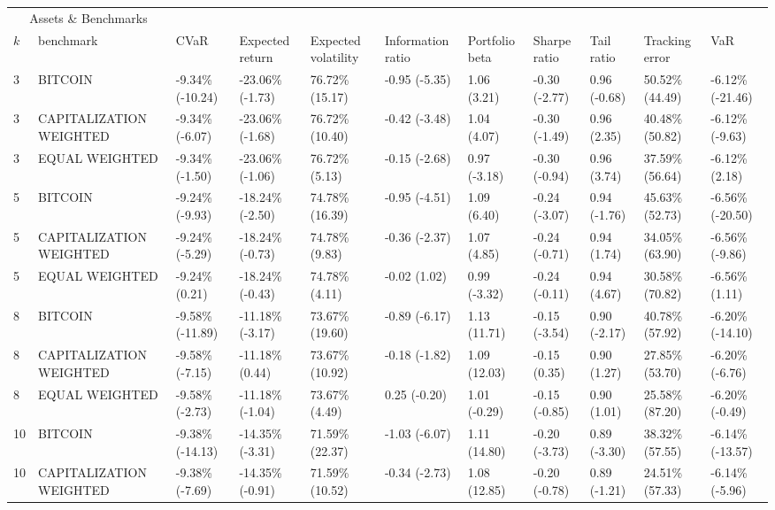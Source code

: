 \documentclass{article}
\begin{document}
\begin{landscape}
\begin{table}[H]
  \centering
  \begin{tabular}{p{0.4cm}|p{3cm}|p{1.65cm}|p{1.65cm}|p{1.65cm}|p{1.65cm}|p{1.65cm}|p{1.65cm}|p{1.65cm}|p{1.65cm}|p{1.65cm}}%
    \toprule
    \multicolumn{2}{c}{Assets \& Benchmarks}                   \\
    \cmidrule(r){1-2}
    $k$ & benchmark & CVaR & Expected return & Expected volatility&Information ratio&Portfolio beta&Sharpe ratio&Tail ratio&Tracking error&VaR\\
    \midrule 
3&BITCOIN&-9.34\% (-10.24)&-23.06\% (-1.73)&76.72\% (15.17)&-0.95 (-5.35)&1.06 (3.21)&-0.30 (-2.77)&0.96 (-0.68)&50.52\% (44.49)&-6.12\% (-21.46)
\\ 
3&CAPITALIZATION WEIGHTED&-9.34\% (-6.07)&-23.06\% (-1.68)&76.72\% (10.40)&-0.42 (-3.48)&1.04 (4.07)&-0.30 (-1.49)&0.96 (2.35)&40.48\% (50.82)&-6.12\% (-9.63)
\\ 
3&EQUAL WEIGHTED&-9.34\% (-1.50)&-23.06\% (-1.06)&76.72\% (5.13)&-0.15 (-2.68)&0.97 (-3.18)&-0.30 (-0.94)&0.96 (3.74)&37.59\% (56.64)&-6.12\% (2.18)
\\ 
5&BITCOIN&-9.24\% (-9.93)&-18.24\% (-2.50)&74.78\% (16.39)&-0.95 (-4.51)&1.09 (6.40)&-0.24 (-3.07)&0.94 (-1.76)&45.63\% (52.73)&-6.56\% (-20.50)
\\ 
5&CAPITALIZATION WEIGHTED&-9.24\% (-5.29)&-18.24\% (-0.73)&74.78\% (9.83)&-0.36 (-2.37)&1.07 (4.85)&-0.24 (-0.71)&0.94 (1.74)&34.05\% (63.90)&-6.56\% (-9.86)
\\ 
5&EQUAL WEIGHTED&-9.24\% (0.21)&-18.24\% (-0.43)&74.78\% (4.11)&-0.02 (1.02)&0.99 (-3.32)&-0.24 (-0.11)&0.94 (4.67)&30.58\% (70.82)&-6.56\% (1.11)
\\ 
8&BITCOIN&-9.58\% (-11.89)&-11.18\% (-3.17)&73.67\% (19.60)&-0.89 (-6.17)&1.13 (11.71)&-0.15 (-3.54)&0.90 (-2.17)&40.78\% (57.92)&-6.20\% (-14.10)
\\ 
8&CAPITALIZATION WEIGHTED&-9.58\% (-7.15)&-11.18\% (0.44)&73.67\% (10.92)&-0.18 (-1.82)&1.09 (12.03)&-0.15 (0.35)&0.90 (1.27)&27.85\% (53.70)&-6.20\% (-6.76)
\\ 
8&EQUAL WEIGHTED&-9.58\% (-2.73)&-11.18\% (-1.04)&73.67\% (4.49)&0.25 (-0.20)&1.01 (-0.29)&-0.15 (-0.85)&0.90 (1.01)&25.58\% (87.20)&-6.20\% (-0.49)
\\ 
10&BITCOIN&-9.38\% (-14.13)&-14.35\% (-3.31)&71.59\% (22.37)&-1.03 (-6.07)&1.11 (14.80)&-0.20 (-3.73)&0.89 (-3.30)&38.32\% (57.55)&-6.14\% (-13.57)
\\ 
10&CAPITALIZATION WEIGHTED&-9.38\% (-7.69)&-14.35\% (-0.91)&71.59\% (10.52)&-0.34 (-2.73)&1.08 (12.85)&-0.20 (-0.78)&0.89 (-1.21)&24.51\% (57.33)&-6.14\% (-5.96)

\end{tabular}
\end{table}
\end{landscape}
\end{document}
